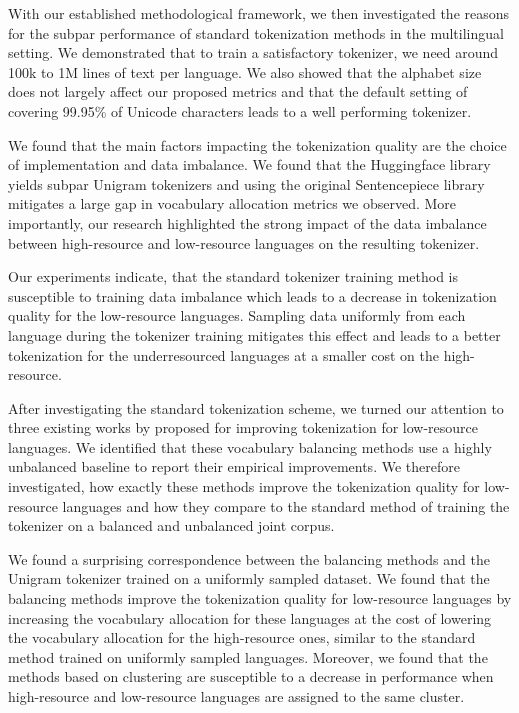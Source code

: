
With our established methodological framework, we then investigated the reasons for the subpar performance of standard tokenization methods in the multilingual setting. We demonstrated that to train a satisfactory tokenizer, we need around 100k to 1M lines of text per language. We also showed that the alphabet size does not largely affect our proposed metrics and that the default setting of covering 99.95\% of Unicode characters leads to a well performing tokenizer. 

We found that the main factors impacting the tokenization quality are the choice of implementation and data imbalance. We found that the Huggingface library yields subpar Unigram tokenizers and using the original Sentencepiece library mitigates a large gap in vocabulary allocation metrics we observed. More importantly, our research highlighted the strong impact of the data imbalance between high-resource and low-resource languages on the resulting tokenizer. 

Our experiments indicate, that the standard tokenizer training method is susceptible to training data imbalance which leads to a decrease in tokenization quality for the low-resource languages. Sampling data uniformly from each language during the tokenizer training mitigates this effect and leads to a better tokenization for the underresourced languages at a smaller cost on the high-resource.

After investigating the standard tokenization scheme, we turned our attention to three existing works by \citet{chung_improving_2020,zheng_allocating_2021,liang_xlm-v_2023} proposed for improving tokenization for low-resource languages. We identified that these vocabulary balancing methods use a highly unbalanced baseline to report their empirical improvements. We therefore investigated, how exactly these methods improve the tokenization quality for low-resource languages and how they compare to the standard method of training the tokenizer on a balanced and unbalanced joint corpus.

We found a surprising correspondence between the balancing methods and the Unigram tokenizer trained on a uniformly sampled dataset. We found that the balancing methods improve the tokenization quality for low-resource languages by increasing the vocabulary allocation for these languages at the cost of lowering the vocabulary allocation for the high-resource ones, similar to the standard method trained on uniformly sampled languages. Moreover, we found that the methods based on clustering are susceptible to a decrease in performance when high-resource and low-resource languages are assigned to the same cluster.

